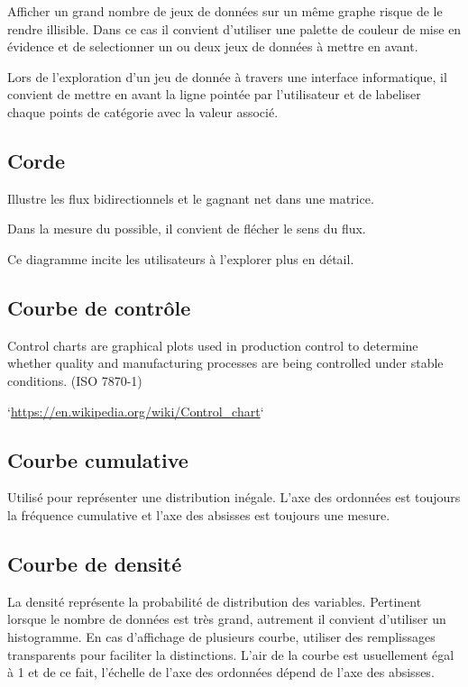 \documentclass[a4paper,12pt]{article}
\begin{document}
\begin{multicols}{2}
Afficher un grand nombre de jeux de données sur un même graphe risque de le rendre illisible. \autocite{jonathanschwabishRelationship2021} Dans ce cas il convient d'utiliser une palette de couleur de mise en évidence et de selectionner un ou deux jeux de données à mettre en avant.

Lors de l'exploration d'un jeu de donnée à travers une interface informatique, il convient de mettre en avant la ligne pointée par l'utilisateur et de labeliser chaque points de catégorie avec la valeur associé. \autocite{sosulskiGraphics2019}
\subsection*{Corde}
\label{sec:org46bd2fa}
Illustre les flux bidirectionnels et le gagnant net dans une matrice. \autocite{alansmithLexiqueVisuel}

Dans la mesure du possible, il convient de flécher le sens du flux.

Ce diagramme incite les utilisateurs à l'explorer plus en détail. \autocite{jonathanschwabishRelationship2021}
\subsection*{Courbe de contrôle}
\label{sec:orga0f781b}

Control charts are graphical plots used in production control to determine whether quality and manufacturing processes are being controlled under stable conditions. (ISO 7870-1)

`\url{https://en.wikipedia.org/wiki/Control\_chart}`
\subsection*{Courbe cumulative}
\label{sec:org1ab8084}
Utilisé pour représenter une distribution inégale. L'axe des ordonnées est toujours la fréquence cumulative et l'axe des absisses est toujours une mesure. \autocite{alansmithLexiqueVisuel}
\subsection*{Courbe de densité}
\label{sec:orgb92f5a3}
La densité représente la probabilité de distribution des variables. \autocite{sosulskiGraphics2019} Pertinent lorsque le nombre de données est très grand, autrement il convient d'utiliser un histogramme. \autocite{wilkeVisualizingManyDistributions2019} En cas d'affichage de plusieurs courbe, utiliser  des remplissages transparents pour faciliter la distinctions. L'air de la courbe est usuellement égal à 1 et de ce fait, l'échelle de l'axe des ordonnées dépend de l'axe des absisses. \autocite{wilkeVisualizingManyDistributions2019}

\end{multicols}
\end{document}
